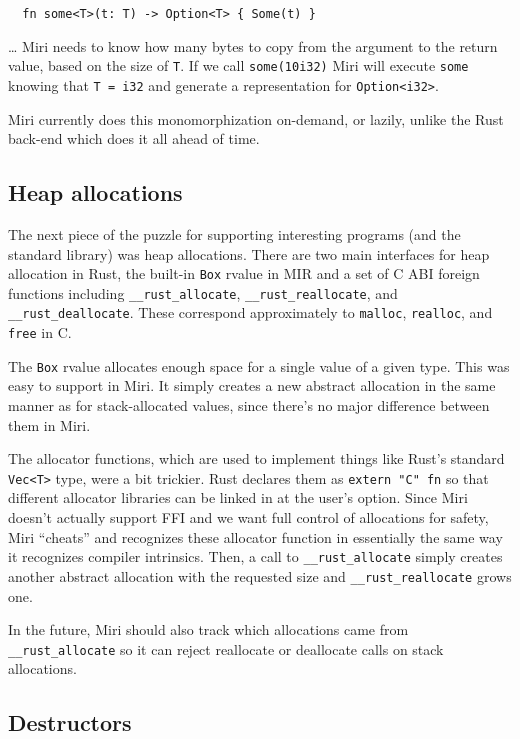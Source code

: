 \documentclass[twocolumn]{article}
\newcommand{\rust}[1]{\texttt{#1}}
\begin{document}
\begin{verbatim}
  fn some<T>(t: T) -> Option<T> { Some(t) }
\end{verbatim}

\ldots{} Miri needs to know how many bytes to copy from the argument to the return value, based on
the size of \rust{T}. If we call \rust{some(10i32)} Miri will execute \rust{some} knowing that
\rust{T = i32} and generate a representation for \rust{Option<i32>}.

Miri currently does this monomorphization on-demand, or lazily, unlike the Rust back-end which does
it all ahead of time.

\subsection{Heap allocations}

The next piece of the puzzle for supporting interesting programs (and the standard library) was heap
allocations. There are two main interfaces for heap allocation in Rust, the built-in \rust{Box}
rvalue in MIR and a set of C ABI foreign functions including \rust{__rust_allocate},
\rust{__rust_reallocate}, and \rust{__rust_deallocate}. These correspond approximately to
\texttt{malloc}, \texttt{realloc}, and \texttt{free} in C.

The \rust{Box} rvalue allocates enough space for a single value of a given type. This was easy to
support in Miri. It simply creates a new abstract allocation in the same manner as for
stack-allocated values, since there's no major difference between them in Miri.

The allocator functions, which are used to implement things like Rust's standard \rust{Vec<T>} type,
were a bit trickier. Rust declares them as \rust{extern "C" fn} so that different allocator
libraries can be linked in at the user's option. Since Miri doesn't actually support FFI and we want
full control of allocations for safety, Miri ``cheats'' and recognizes these allocator function in
essentially the same way it recognizes compiler intrinsics. Then, a call to \rust{__rust_allocate}
simply creates another abstract allocation with the requested size and \rust{__rust_reallocate}
grows one.

In the future, Miri should also track which allocations came from \rust{__rust_allocate} so it can
reject reallocate or deallocate calls on stack allocations.

\subsection{Destructors}
\end{document}
